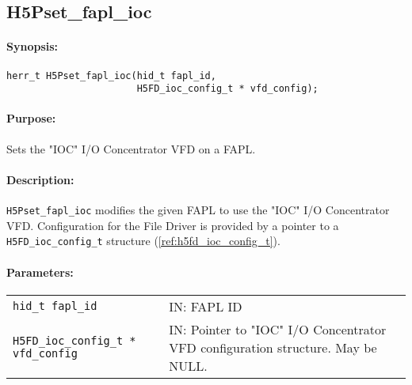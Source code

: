 \documentclass[../main.tex]{subfiles}
\begin{document}
\newpage

\subsection{H5Pset\_fapl\_ioc}
\label{ref:h5p_set_fapl_ioc}

\paragraph{Synopsis:}
\begin{flushleft}%
\begin{verbatim}
herr_t H5Pset_fapl_ioc(hid_t fapl_id,
                       H5FD_ioc_config_t * vfd_config);
\end{verbatim}
\end{flushleft}%

\paragraph{Purpose:}
\begin{flushleft}%
Sets the "IOC" I/O Concentrator \Gls{VFD} on a \Gls{FAPL}.
\end{flushleft}%

\paragraph{Description:}
\begin{flushleft}%
\texttt{H5Pset\_fapl\_ioc} modifies the given \Gls{FAPL} to use the
"IOC" I/O Concentrator \Gls{VFD}. Configuration for the File Driver
is provided by a pointer to a \texttt{H5FD\_ioc\_config\_t} structure
(\ref{ref:h5fd_ioc_config_t}).
\end{flushleft}%

\paragraph{Parameters:}
\begin{flushleft}%
 \begin{tabular}{lp{}}%
   \texttt{hid\_t fapl\_id} & IN: \Gls{FAPL} ID \\
   \texttt{H5FD\_ioc\_config\_t * vfd\_config} & IN: Pointer to
   "IOC" I/O Concentrator VFD configuration structure. May be NULL. \\
 \end{tabular}%
\end{flushleft}%
\end{document}
